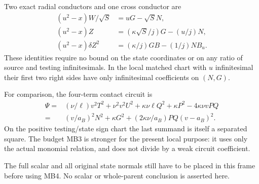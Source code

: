Two exact radial conductors and one cross conductor are
\[
 \begin{split}
 (u^2-x)W/\sqrt S&=uG-\sqrt S N,\\
 (u^2-x)Z&=(\kappa\sqrt S/j)G-(u/j)N,\\
 (u^2-x)\delta Z^2&=(\kappa/j)GB-(1/j)NB_u.
 \end{split}
 \tag{MB5}
\]
These identities require no bound on the state coordinates or on
any ratio of source and testing infinitesimals. In the local matched
chart with $u$ infinitesimal their first two right sides have only
infinitesimal coefficients on $(N,G)$.

For comparison, the four-term contact circuit is
\[
 \begin{split}
 \Psi={}&(\nu/\ell)v^2T^2+\nu^2v^2U^2
       +\kappa\nu\ell Q^2+\kappa P^2-4\kappa\nu vPQ\\
   ={}&(v/a_B)^2N^2+\kappa G^2
           +(2\kappa\nu/a_B)PQ(v-a_B)^2.
 \end{split}
 \tag{MB6}
\]
On the positive testing/state sign chart the last summand is itself
a separated square. The budget MB3 is stronger for the present local
purpose: it uses only the actual monomial relation, and does not
divide by a weak circuit coefficient.

The full scalar and all original state normals still have to be
placed in this frame before using MB4. No scalar or whole-parent
conclusion is asserted here.
